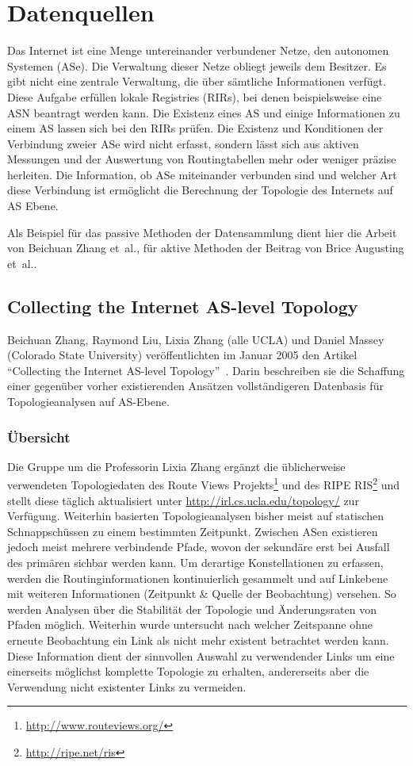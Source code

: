 \section{Datenquellen}\label{sec:datenquellen}

Das Internet ist eine Menge untereinander verbundener Netze, den autonomen Systemen (ASe).
Die Verwaltung dieser Netze obliegt jeweils dem Besitzer. Es gibt nicht eine zentrale Verwaltung, die über sämtliche Informationen verfügt.
Diese Aufgabe erfüllen lokale Registries (RIRs), bei denen beispielsweise eine ASN beantragt werden kann.
Die Existenz eines AS und einige Informationen zu einem AS lassen sich bei den RIRs prüfen.
Die Existenz und Konditionen der Verbindung zweier ASe wird nicht erfasst, sondern lässt sich aus aktiven Messungen und der Auswertung von Routingtabellen mehr oder weniger präzise herleiten.
Die Information, ob ASe miteinander verbunden sind und welcher Art diese Verbindung ist ermöglicht die Berechnung der Topologie des Internets auf AS Ebene.

Als Beispiel für das passive Methoden der Datensammlung dient hier die Arbeit von Beichuan Zhang et\ al., für aktive Methoden der Beitrag von Brice Augusting et\ al..

\subsection{Collecting the Internet AS-level Topology}

Beichuan Zhang, Raymond Liu, Lixia Zhang (alle UCLA) und Daniel Massey (Colorado State University) veröffentlichten im Januar 2005 den Artikel "`Collecting the Internet AS-level Topology"'~\cite{Zhang:2005:CIA:1052812.1052825}.
Darin beschreiben sie die Schaffung einer gegenüber vorher existierenden Ansätzen vollständigeren Datenbasis für Topologieanalysen auf AS-Ebene.

\subsubsection{Übersicht}
Die Gruppe um die Professorin Lixia Zhang ergänzt die üblicherweise verwendeten Topologiedaten des Route Views Projekts\footnote{\url{http://www.routeviews.org/}} und des RIPE RIS\footnote{\url{http://ripe.net/ris}} und stellt diese täglich aktualisiert unter \url{http://irl.cs.ucla.edu/topology/} zur Verfügung.
Weiterhin basierten Topologieanalysen bisher meist auf statischen Schnappschüssen zu einem bestimmten Zeitpunkt.
Zwischen ASen existieren jedoch meist mehrere verbindende Pfade, wovon der sekundäre erst bei Ausfall des primären sichbar werden kann.
Um derartige Konstellationen zu erfassen, werden die Routinginformationen kontinuierlich gesammelt und auf Linkebene mit weiteren Informationen (Zeitpunkt \& Quelle der Beobachtung) versehen.
So werden Analysen über die Stabilität der Topologie und Änderungsraten von Pfaden möglich.
Weiterhin wurde untersucht nach welcher Zeitspanne ohne erneute Beobachtung ein Link als nicht mehr existent betrachtet werden kann.
Diese Information dient der sinnvollen Auswahl zu verwendender Links um eine einerseits möglichst komplette Topologie zu erhalten, andererseits aber die Verwendung nicht existenter Links zu vermeiden.

